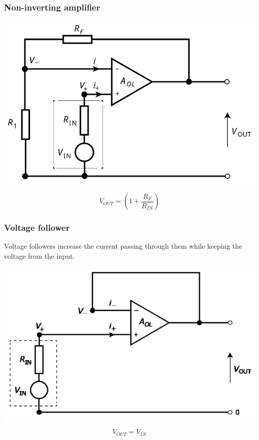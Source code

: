 \documentclass[11pt]{article}
\begin{document}
\subsubsection{Non-inverting amplifier}
\label{sec:org4bce460}
\begin{center}
\includegraphics[width=.9\linewidth]{./images/non-inverting-amplifier.png}
\end{center}
\[V_{OUT} = \left(1 + \frac{R_F}{R_{IN}} \right)\]
\subsubsection{Voltage follower}
\label{sec:orgecf0518}
Voltage followers increase the current passing through them while keeping the voltage from the input.
\begin{center}
\includegraphics[width=.9\linewidth]{./images/voltage-follower.png}
\end{center}
\[V_{OUT} = V_{IN}\]
\end{document}
